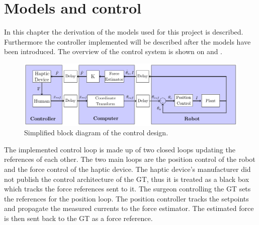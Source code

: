 \chapter{Models and control}
In this chapter the derivation of the models used for this project is described. Furthermore the controller implemented will be described after the models have been introduced. The overview of the control system is shown on  and .
 
\begin{figure}[H]
	\includegraphics[width=\textwidth]{rapport/pictures/control.pdf} 
	\caption{Simplified block diagram of the control design.}
	\label{fig:simple_control}
\end{figure}

The implemented control loop is made up of two closed loops updating the references of each other. The two main loops are the position control of the robot and the force control of the haptic device. The haptic device's manufacturer did not publish the control architecture of the GT, thus it is treated as a black box which tracks the force references sent to it. The surgeon controlling the GT sets the references for the position loop. The position controller tracks the setpoints and propagate the measured currents to the force estimator. The estimated force is then sent back to the GT as a force reference. 








